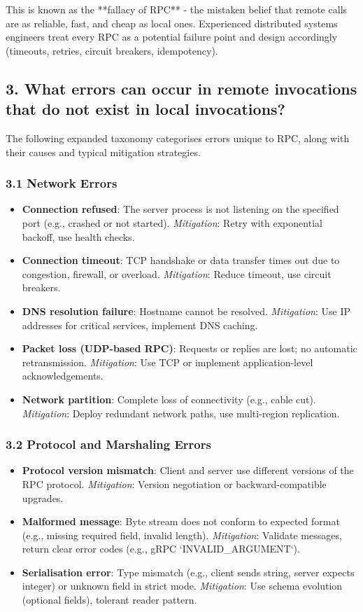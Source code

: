 \documentclass[a4paper]{article}
\begin{document}
This is known as the **fallacy of RPC** - the mistaken belief that remote calls are as reliable, fast, and cheap as local ones. Experienced distributed systems engineers treat every RPC as a potential failure point and design accordingly (timeouts, retries, circuit breakers, idempotency).

\subsection{3. What errors can occur in remote invocations that do not exist in local invocations?}

The following expanded taxonomy categorises errors unique to RPC, along with their causes and typical mitigation strategies.

\subsubsection{3.1 Network Errors}
\begin{itemize}
    \item \textbf{Connection refused}: The server process is not listening on the specified port (e.g., crashed or not started). \textit{Mitigation}: Retry with exponential backoff, use health checks.
    \item \textbf{Connection timeout}: TCP handshake or data transfer times out due to congestion, firewall, or overload. \textit{Mitigation}: Reduce timeout, use circuit breakers.
    \item \textbf{DNS resolution failure}: Hostname cannot be resolved. \textit{Mitigation}: Use IP addresses for critical services, implement DNS caching.
    \item \textbf{Packet loss (UDP-based RPC)}: Requests or replies are lost; no automatic retransmission. \textit{Mitigation}: Use TCP or implement application-level acknowledgements.
    \item \textbf{Network partition}: Complete loss of connectivity (e.g., cable cut). \textit{Mitigation}: Deploy redundant network paths, use multi-region replication.
\end{itemize}

\subsubsection{3.2 Protocol and Marshaling Errors}
\begin{itemize}
    \item \textbf{Protocol version mismatch}: Client and server use different versions of the RPC protocol. \textit{Mitigation}: Version negotiation or backward-compatible upgrades.
    \item \textbf{Malformed message}: Byte stream does not conform to expected format (e.g., missing required field, invalid length). \textit{Mitigation}: Validate messages, return clear error codes (e.g., gRPC `INVALID\_ARGUMENT`).
    \item \textbf{Serialisation error}: Type mismatch (e.g., client sends string, server expects integer) or unknown field in strict mode. \textit{Mitigation}: Use schema evolution (optional fields), tolerant reader pattern.
\end{itemize}
\end{document}
